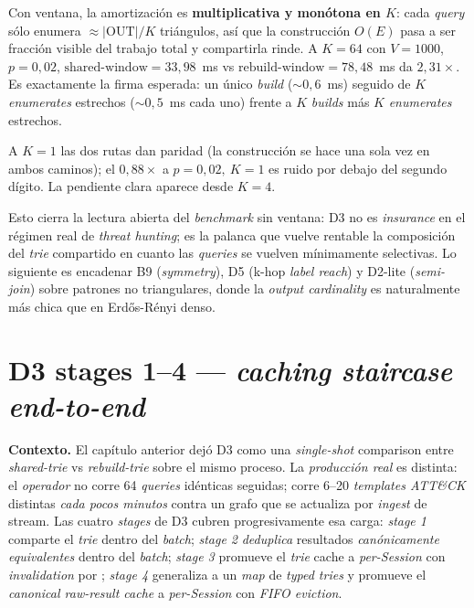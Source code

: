 \documentclass[11pt,a4paper]{report}
\newcommand{\code}[1]{\texttt{\detokenize{#1}}}
\begin{document}
Con ventana, la amortización es \textbf{multiplicativa y monótona en $K$}: cada \emph{query} sólo enumera $\approx |\mathrm{OUT}|/K$ triángulos, así que la construcción $O(E)$ pasa a ser fracción visible del trabajo total y compartirla rinde. A $K=64$ con $V=1000$, $p=0{,}02$, $\mathrm{shared\text{-}window} = 33{,}98$~ms vs $\mathrm{rebuild\text{-}window} = 78{,}48$~ms da $2{,}31\times$. Es exactamente la firma esperada: un único \emph{build} ($\sim 0{,}6$~ms) seguido de $K$ \emph{enumerates} estrechos ($\sim 0{,}5$~ms cada uno) frente a $K$ \emph{builds} más $K$ \emph{enumerates} estrechos.

A $K=1$ las dos rutas dan paridad (la construcción se hace una sola vez en ambos caminos); el $0{,}88\times$ a $p=0{,}02,\ K=1$ es ruido por debajo del segundo dígito. La pendiente clara aparece desde $K=4$.

Esto cierra la lectura abierta del \emph{benchmark} sin ventana: D3 no es \emph{insurance} en el régimen real de \emph{threat hunting}; es la palanca que vuelve rentable la composición del \emph{trie} compartido en cuanto las \emph{queries} se vuelven mínimamente selectivas. Lo siguiente es encadenar B9 (\emph{symmetry}), D5 (k-hop \emph{label reach}) y D2-lite (\emph{semi-join}) sobre patrones no triangulares, donde la \emph{output cardinality} es naturalmente más chica que en Erdős-Rényi denso.

\chapter{D3 stages 1--4 --- \emph{caching staircase} \emph{end-to-end}}

\textbf{Contexto.} El capítulo anterior dejó D3 como una \emph{single-shot} comparison entre \emph{shared-trie} vs \emph{rebuild-trie} sobre el mismo proceso. La \emph{producción real} es distinta: el \emph{operador} no corre 64 \emph{queries} idénticas seguidas; corre 6--20 \emph{templates ATT\&CK} distintas \emph{cada pocos minutos} contra un grafo que se actualiza por \emph{ingest} de stream. Las cuatro \emph{stages} de D3 cubren progresivamente esa carga: \emph{stage 1} comparte el \emph{trie} dentro del \emph{batch}; \emph{stage 2} \emph{deduplica} resultados \emph{canónicamente equivalentes} dentro del \emph{batch}; \emph{stage 3} promueve el \emph{trie} cache a \emph{per-Session} con \emph{invalidation} por \code{mutation\_version}; \emph{stage 4} generaliza a un \emph{map} de \emph{typed tries} y promueve el \emph{canonical raw-result cache} a \emph{per-Session} con \emph{FIFO eviction}.
\end{document}
